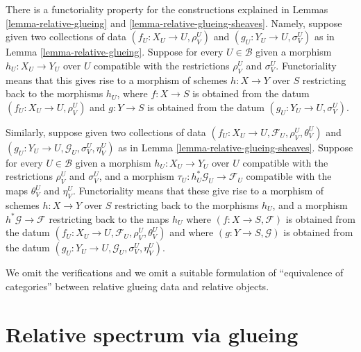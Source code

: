 \begin{remark}
\label{remark-relative-glueing-functorial}
There is a functoriality property for the constructions explained
in Lemmas \ref{lemma-relative-glueing} and
\ref{lemma-relative-glueing-sheaves}. Namely, suppose given
two collections of data $(f_U : X_U \to U, \rho^U_V)$ and
$(g_U : Y_U \to U, \sigma^U_V)$ as in Lemma \ref{lemma-relative-glueing}.
Suppose for every $U \in \mathcal{B}$ given
a morphism $h_U : X_U \to Y_U$ over $U$ compatible with
the restrictions $\rho^U_V$ and $\sigma^U_V$. Functoriality
means that this gives rise to a morphism of schemes
$h : X \to Y$ over $S$ restricting back to the morphisms $h_U$,
where $f : X \to S$ is obtained from
the datum $(f_U : X_U \to U, \rho^U_V)$ and $g : Y \to S$
is obtained from the datum $(g_U : Y_U \to U, \sigma^U_V)$.

\medskip\noindent
Similarly, suppose given
two collections of data
$(f_U : X_U \to U, \mathcal{F}_U, \rho^U_V, \theta^U_V)$ and
$(g_U : Y_U \to U, \mathcal{G}_U, \sigma^U_V, \eta^U_V)$
as in Lemma \ref{lemma-relative-glueing-sheaves}.
Suppose for every $U \in \mathcal{B}$ given
a morphism $h_U : X_U \to Y_U$ over $U$ compatible with
the restrictions $\rho^U_V$ and $\sigma^U_V$, and a morphism
$\tau_U : h_U^*\mathcal{G}_U \to \mathcal{F}_U$ compatible with
the maps $\theta^U_V$ and $\eta^U_V$. Functoriality
means that these give rise to a morphism of schemes
$h : X \to Y$ over $S$ restricting back to the morphisms $h_U$,
and a morphism $h^*\mathcal{G} \to \mathcal{F}$ restricting back
to the maps $h_U$
where $(f : X \to S, \mathcal{F})$ is obtained from the datum
$(f_U : X_U \to U, \mathcal{F}_U, \rho^U_V, \theta^U_V)$ and
where $(g : Y \to S, \mathcal{G})$ is obtained from the datum
$(g_U : Y_U \to U, \mathcal{G}_U, \sigma^U_V, \eta^U_V)$.

\medskip\noindent
We omit the verifications and we omit a suitable formulation of
``equivalence of categories'' between relative glueing data
and relative objects.
\end{remark}















\section{Relative spectrum via glueing}
\label{section-spec-via-glueing}

